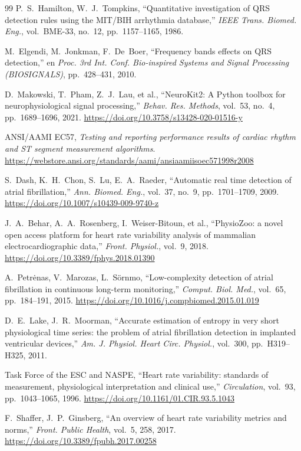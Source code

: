 \documentclass[11pt,a4paper]{article}
\begin{document}
\begin{thebibliography}{99}
 P.~S.~Hamilton, W.~J.~Tompkins, ``Quantitative investigation of QRS detection rules using the MIT/BIH arrhythmia database,'' \textit{IEEE Trans. Biomed. Eng.}, vol.~BME-33, no.~12, pp.~1157--1165, 1986.

 M.~Elgendi, M.~Jonkman, F.~De~Boer, ``Frequency bands effects on QRS detection,'' en \textit{Proc. 3rd Int. Conf. Bio-inspired Systems and Signal Processing (BIOSIGNALS)}, pp.~428--431, 2010.

 D.~Makowski, T.~Pham, Z.~J.~Lau, et al., ``NeuroKit2: A Python toolbox for neurophysiological signal processing,'' \textit{Behav. Res. Methods}, vol.~53, no.~4, pp.~1689--1696, 2021. \url{https://doi.org/10.3758/s13428-020-01516-y}

 ANSI/AAMI EC57, \textit{Testing and reporting performance results of cardiac rhythm and ST segment measurement algorithms}. \url{https://webstore.ansi.org/standards/aami/ansiaamiisoec571998r2008}

 S.~Dash, K.~H.~Chon, S.~Lu, E.~A.~Raeder, ``Automatic real time detection of atrial fibrillation,'' \textit{Ann. Biomed. Eng.}, vol.~37, no.~9, pp.~1701--1709, 2009. \url{https://doi.org/10.1007/s10439-009-9740-z}

 J.~A.~Behar, A.~A.~Rosenberg, I.~Weiser-Bitoun, et al., ``PhysioZoo: a novel open access platform for heart rate variability analysis of mammalian electrocardiographic data,'' \textit{Front. Physiol.}, vol.~9, 2018. \url{https://doi.org/10.3389/fphys.2018.01390}

 A.~Petrėnas, V.~Marozas, L.~Sörnmo, ``Low-complexity detection of atrial fibrillation in continuous long-term monitoring,'' \textit{Comput. Biol. Med.}, vol.~65, pp.~184--191, 2015. \url{https://doi.org/10.1016/j.compbiomed.2015.01.019}

 D.~E.~Lake, J.~R.~Moorman, ``Accurate estimation of entropy in very short physiological time series: the problem of atrial fibrillation detection in implanted ventricular devices,'' \textit{Am. J. Physiol. Heart Circ. Physiol.}, vol.~300, pp.~H319--H325, 2011.

 Task Force of the ESC and NASPE, ``Heart rate variability: standards of measurement, physiological interpretation and clinical use,'' \textit{Circulation}, vol.~93, pp.~1043--1065, 1996. \url{https://doi.org/10.1161/01.CIR.93.5.1043}

 F.~Shaffer, J.~P.~Ginsberg, ``An overview of heart rate variability metrics and norms,'' \textit{Front. Public Health}, vol.~5, 258, 2017. \url{https://doi.org/10.3389/fpubh.2017.00258}


\end{thebibliography}
\end{document}
